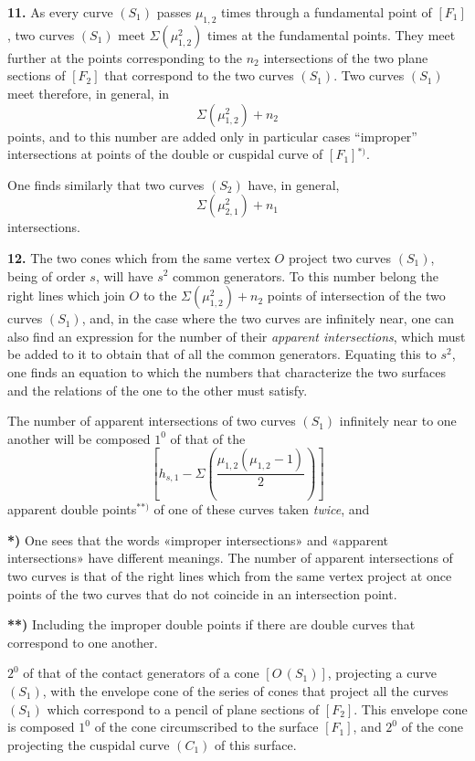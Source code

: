\documentclass{article}
\begin{document}
\textbf{11.} As every curve $(S_1)$ passes $\mu_{1, 2}$ times through a fundamental point of $[F_1]$, two curves $(S_1)$ meet $\Sigma(\mu_{1, 2}^2)$ times at the fundamental points. They meet further at the points corresponding to the $n_2$ intersections of the two plane sections of $[F_2]$ that correspond to the two curves $(S_1)$. Two curves $(S_1)$ meet therefore, in general, in
\[
\Sigma(\mu_{1, 2}^2) + n_2
\]
points, and to this number are added only in particular cases ``improper'' intersections at points of the double or cuspidal curve of $[F_1]$${}^{*)}$.

One finds similarly that two curves $(S_2)$ have, in general,
\[
\Sigma(\mu_{2, 1}^2) + n_1
\]
intersections.

\textbf{12.} The two cones which from the same vertex $O$ project two curves $(S_1)$, being of order $s$, will have $s^2$ common generators. To this number belong the right lines which join $O$ to the $\Sigma(\mu_{1, 2}^2) + n_2$ points of intersection of the two curves $(S_1)$, and, in the case where the two curves are infinitely near, one can also find an expression for the number of their \emph{apparent intersections}, which must be added to it to obtain that of all the common generators. Equating this to $s^2$, one finds an equation to which the numbers that characterize the two surfaces and the relations of the one to the other must satisfy.

The number of apparent intersections of two curves $(S_1)$ infinitely near to one another will be composed $1^0$ of that of the
\[
\left[ h_{s, 1} - \Sigma\left( \frac{\mu_{1, 2}(\mu_{1, 2} - 1)}{2} \right) \right]
\]
apparent double points${}^{**)}$ of one of these curves taken \emph{twice}, and

\textbf{*)} One sees that the words «improper intersections» and «apparent intersections» have different meanings. The number of apparent intersections of two curves is that of the right lines which from the same vertex project at once points of the two curves that do not coincide in an intersection point.

\textbf{**)} Including the improper double points if there are double curves that correspond to one another.

$2^0$ of that of the contact generators of a cone $[O\,(S_1)]$, projecting a curve $(S_1)$, with the envelope cone of the series of cones that project all the curves $(S_1)$ which correspond to a pencil of plane sections of $[F_2]$. This envelope cone is composed $1^0$ of the cone circumscribed to the surface $[F_1]$, and $2^0$ of the cone projecting the cuspidal curve $(C_1)$ of this surface.
\end{document}

